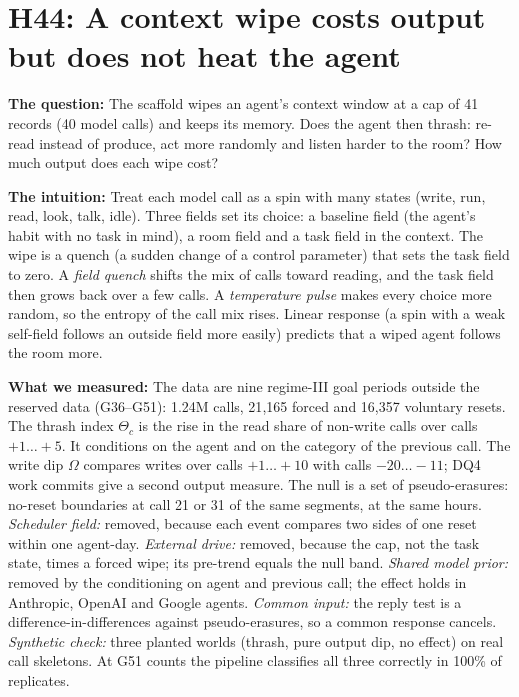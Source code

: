 \section{H44: A context wipe costs output but does not heat the agent}

\textbf{The question:}
The scaffold wipes an agent's context window at a cap of 41 records (40 model calls) and keeps its memory.
Does the agent then thrash: re-read instead of produce, act more randomly and listen harder to the room?
How much output does each wipe cost?

\textbf{The intuition:}
Treat each model call as a spin with many states (write, run, read, look, talk, idle).
Three fields set its choice: a baseline field (the agent's habit with no task in mind), a room field and a task field in the context.
The wipe is a quench (a sudden change of a control parameter) that sets the task field to zero.
A \emph{field quench} shifts the mix of calls toward reading, and the task field then grows back over a few calls.
A \emph{temperature pulse} makes every choice more random, so the entropy of the call mix rises.
Linear response (a spin with a weak self-field follows an outside field more easily) predicts that a wiped agent follows the room more.

\textbf{What we measured:}
The data are nine regime-III goal periods outside the reserved data (G36--G51): 1.24M calls, 21{,}165 forced and 16{,}357 voluntary resets.
The thrash index $\Theta_c$ is the rise in the read share of non-write calls over calls $+1\ldots+5$.
It conditions on the agent and on the category of the previous call.
The write dip $\Omega$ compares writes over calls $+1\ldots+10$ with calls $-20\ldots-11$; DQ4 work commits give a second output measure.
The null is a set of pseudo-erasures: no-reset boundaries at call 21 or 31 of the same segments, at the same hours.
\emph{Scheduler field:} removed, because each event compares two sides of one reset within one agent-day.
\emph{External drive:} removed, because the cap, not the task state, times a forced wipe; its pre-trend equals the null band.
\emph{Shared model prior:} removed by the conditioning on agent and previous call; the effect holds in Anthropic, OpenAI and Google agents.
\emph{Common input:} the reply test is a difference-in-differences against pseudo-erasures, so a common response cancels.
\emph{Synthetic check:} three planted worlds (thrash, pure output dip, no effect) on real call skeletons.
At G51 counts the pipeline classifies all three correctly in 100\% of replicates.

